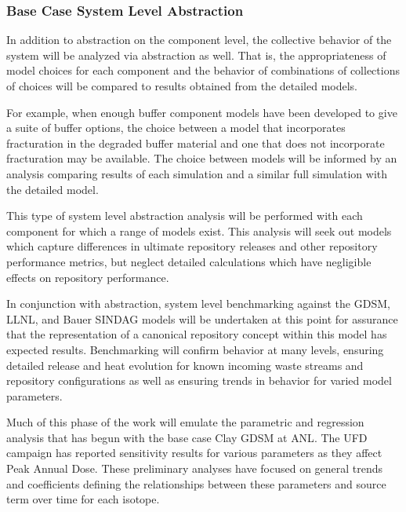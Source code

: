 \subsubsection{Base Case System Level Abstraction}


In addition to abstraction on the component level, the collective behavior of 
the system will be analyzed via abstraction as well. That is, the
appropriateness of model choices for each component and the behavior of 
combinations of collections of choices will be compared to results obtained from 
the detailed models. 


For example, when enough buffer component models have been developed to give a 
suite of buffer options, the choice between a model that incorporates
fracturation in the degraded buffer material and one that does not incorporate 
fracturation may be available.  The choice between models will be informed by an 
analysis comparing results of each simulation and a similar full simulation with  
the detailed model.


This type of system level abstraction analysis will be performed with each 
component for which a range of models exist. This analysis will seek out models 
which capture differences in ultimate repository releases and other repository 
performance metrics, but neglect detailed calculations which have negligible effects
on repository performance.


In conjunction with abstraction, system level benchmarking against the \gls{GDSM}, 
\gls{LLNL}, and Bauer \gls{SINDAG} models will be undertaken at this point for 
assurance that the representation of a canonical repository concept within this  
model has expected results. Benchmarking will confirm behavior at many levels, 
ensuring detailed release and heat evolution for known incoming waste streams
and repository configurations as well as ensuring trends in behavior for 
varied model parameters.


Much of this phase of the work will emulate the parametric and regression analysis that
has begun with the base case Clay \gls{GDSM} at \gls{ANL}.  
The \gls{UFD} campaign has reported sensitivity results for various 
parameters as they affect Peak Annual Dose. These preliminary analyses have focused on 
general trends and coefficients defining the relationships between these 
parameters and source term over time for each isotope. 

